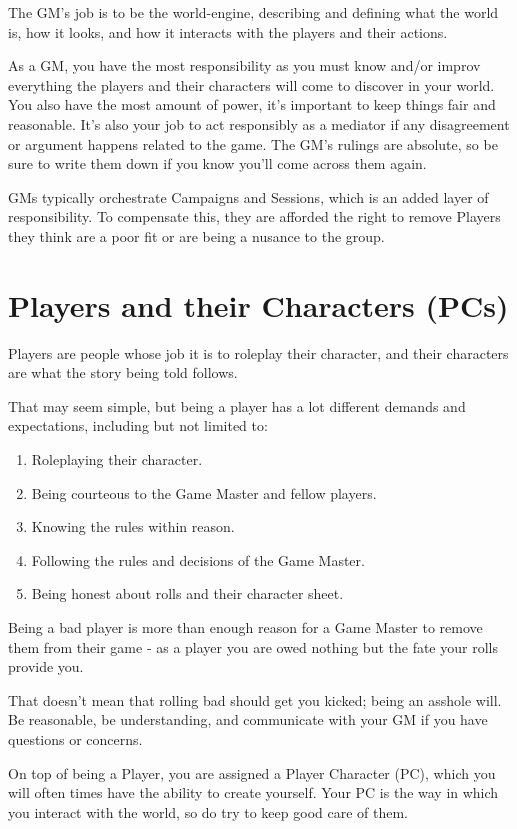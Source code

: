 \documentclass[../main.tex]{subfiles}
\begin{document}
    The GM's job is to be the world-engine, describing and defining what the world is, how it looks, and how it interacts with the players and their actions.
    
    As a GM, you have the most responsibility as you must know and/or improv everything the players and their characters will come to discover in your world. You also have the most amount of power, it's important to keep things fair and reasonable. It's also your job to act responsibly as a mediator if any disagreement or argument happens related to the game. The GM's rulings are absolute, so be sure to write them down if you know you'll come across them again.
    
    GMs typically orchestrate Campaigns and Sessions, which is an added layer of responsibility. To compensate this, they are afforded the right to remove Players they think are a poor fit or are being a nusance to the group.

    \section{Players and their Characters (PCs)}

    Players are people whose job it is to roleplay their character, and their characters are what the story being told follows.

    That may seem simple, but being a player has a lot different demands and expectations, including but not limited to:

    \begin{enumerate}
        \item Roleplaying their character.
        \item Being courteous to the Game Master and fellow players.
        \item Knowing the rules within reason.
        \item Following the rules and decisions of the Game Master.
        \item Being honest about rolls and their character sheet.
    \end{enumerate}

    Being a bad player is more than enough reason for a Game Master to remove them from their game - as a player you are owed nothing but the fate your rolls provide you.

    That doesn't mean that rolling bad should get you kicked; being an asshole will. Be reasonable, be understanding, and communicate with your GM if you have questions or concerns.

    On top of being a Player, you are assigned a Player Character (PC), which you will often times have the ability to create yourself. Your PC is the way in which you interact with the world, so do try to keep good care of them.
\end{document}

